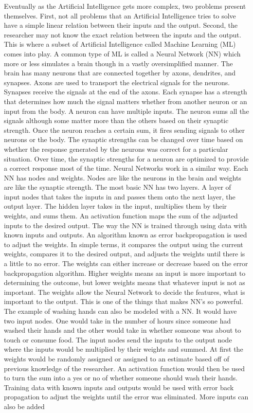 \documentclass[]{article}
\begin{document}
			Eventually as the Artificial Intelligence gets more complex, two problems present themselves. First, not all problems that an Artificial Intelligence tries to solve have a simple linear relation between their inputs and the output. Second, the researcher may not know the exact relation between the inputs and the output. This is where a subset of Artificial Intelligence called Machine Learning (ML) comes into play. A common type of  ML is called a Neural Network (NN) which more or less simulates a brain though in a vastly oversimplified manner. The brain has many neurons that are connected together by axons, dendrites, and synapses. Axons are used to transport the electrical signals for the neurons. Synapses receive the signals at the end of the axons. Each synapse has a strength that determines how much the signal matters whether from another neuron or an input from the body. A neuron can have multiple inputs. The neuron sums all the signals although some matter more than the others based on their synaptic strength. Once the neuron reaches a certain sum, it fires sending signals to other neurons or the body. The synaptic strengths can be changed over time based on whether the response generated by the neurons was correct for a particular situation. Over time, the synaptic strengths for a neuron are optimized to provide a correct response most of the time. Neural Networks work in a similar way. Each NN has nodes and weights. Nodes are like the neurons in the brain and weights are like the synaptic strength. The most basic NN has two layers. A layer of input nodes that takes the inputs in and passes them onto the next layer, the output layer. The hidden layer takes in the input, multiplies them by their weights, and sums them. An activation function maps the sum of the adjusted inputs to the desired output. The way the NN is trained through using data with known inputs and outputs. An algorithm known as error backpropagation is used to adjust the weights. In simple terms, it compares the output using the current weights, compares it to the desired output, and adjusts the weights until there is a little to no error.\cite{bishop2006pattern} The weights can either increase or decrease based on the error backpropagation algorithm. Higher weights means an input is more important to determining the outcome, but lower weights means that whatever input is not as important. The weights allow the Neural Network to decide the features, what is important to the output. This is one of the things that makes NN’s so powerful. The example of washing hands can also be modeled with a NN. It would have two input nodes. One would take in the number of hours since someone had washed their hands and the other would take in whether someone was about to touch or consume food. The input nodes send the inputs to the output node where the inputs would be multiplied by their weights and summed. At first the weights would be randomly assigned or assigned to an estimate based off of previous knowledge of the researcher. An activation function would then be used to turn the sum into a yes or no of whether someone should wash their hands. Training data with known inputs and outputs would be used with error back propagation to adjust the weights until the error was eliminated. More inputs can also be added 
\end{document}
